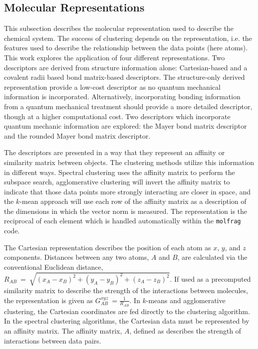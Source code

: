  \subsection{\label{sec:frag_desc}Molecular Representations}

This subsection describes the molecular representation used to describe the chemical system. 
The success of clustering depends on the representation, i.e. the features used to describe the relationship between the data points (here atoms).
This work explores the application of four different representations. Two descriptors are derived from structure information alone: Cartesian-based and a covalent radii based bond matrix-based descriptors. 
The structure-only derived representation provide a low-cost descriptor as no quantum mechanical information is incorporated.
Alternatively, incorporating bonding information from a quantum mechanical treatment should provide a more detailed descriptor, though at a higher computational cost. Two descriptors which incorporate quantum mechanic information are explored: the Mayer bond matrix descriptor and the rounded Mayer bond matrix descriptor.

The descriptors are presented in a way that they represent an affinity or similarity matrix between objects. The clustering methods utilize this information in different ways. Spectral clustering uses the affinity matrix to perform the subspace search, agglomerative clustering will invert the affinity matrix to indicate that those data points more strongly interacting are closer in space, and the $k$-mean approach will use each row of the affinity matrix as a description of the dimensions in which the vector norm is measured. 
The representation is the reciprocal of each element which is handled automatically within the \texttt{molfrag} code.

The Cartesian representation describes the position of each atom  as  $x$, $y$, and $z$ components. 
Distances between any two atoms, $A$ and $B$, are calculated via the conventional Euclidean distance, $R_{AB}\ =\ \sqrt{(x_A - x_B)^2+(y_A -y_B)^2+(z_A - z_B)^2}$.
If used as a precomputed similarity matrix to describe the strength of the interactions between molecules, the representation is given as $G^{xyz}_{AB}\ =  \frac{1}{R_{AB}}$.
In $k$-means and agglomerative clustering, the Cartesian coordinates are fed directly to the clustering algorithm. 
In the spectral clustering algorithms, the Cartesian data must be represented by an affinity matrix.
The affinity matrix, $A$, defined as describes the strength of interactions between data pairs.

